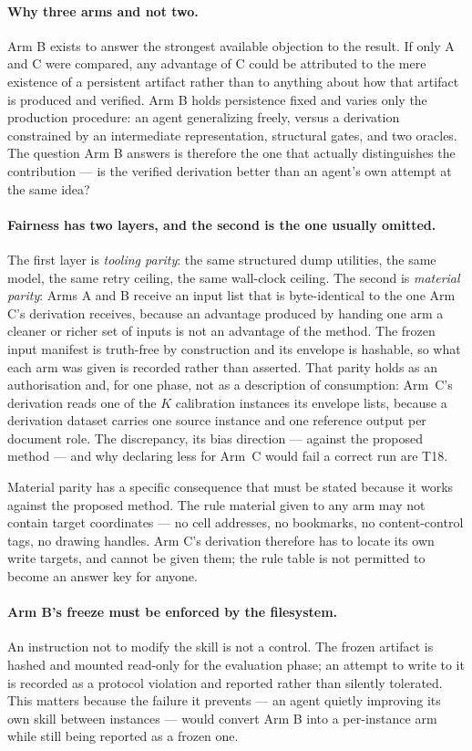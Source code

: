 \paragraph{Why three arms and not two.}
Arm B exists to answer the strongest available objection to the result. If only A and C were
compared, any advantage of C could be attributed to the mere existence of a persistent
artifact rather than to anything about how that artifact is produced and verified. Arm B
holds persistence fixed and varies only the production procedure: an agent generalizing
freely, versus a derivation constrained by an intermediate representation, structural gates,
and two oracles. The question Arm B answers is therefore the one that actually distinguishes
the contribution --- is the verified derivation better than an agent's own attempt at the
same idea?

\paragraph{Fairness has two layers, and the second is the one usually omitted.}
The first layer is \emph{tooling parity}: the same structured dump utilities, the same model,
the same retry ceiling, the same wall-clock ceiling. The second is \emph{material parity}:
Arms A and B receive an input list that is byte-identical to the one Arm C's derivation
receives, because an advantage produced by handing one arm a cleaner or richer set of inputs
is not an advantage of the method. The frozen input manifest is truth-free by construction and
its envelope is hashable, so what each arm was given is recorded rather than asserted.
That parity holds as an authorisation and, for one phase, not as a description of consumption:
Arm~C's derivation reads one of the $K$ calibration instances its envelope lists, because a
derivation dataset carries one source instance and one reference output per document role. The
discrepancy, its bias direction --- against the proposed method --- and why declaring less for
Arm~C would fail a correct run are T18.

Material parity has a specific consequence that must be stated because it works against the
proposed method. The rule material given to any arm may not contain target coordinates ---
no cell addresses, no bookmarks, no content-control tags, no drawing handles. Arm C's
derivation therefore has to locate its own write targets, and cannot be given them; the rule
table is not permitted to become an answer key for anyone.

\paragraph{Arm B's freeze must be enforced by the filesystem.}
An instruction not to modify the skill is not a control. The frozen artifact is hashed and
mounted read-only for the evaluation phase; an attempt to write to it is recorded as a
protocol violation and reported rather than silently tolerated. This matters because the
failure it prevents --- an agent quietly improving its own skill between instances --- would
convert Arm B into a per-instance arm while still being reported as a frozen one.

